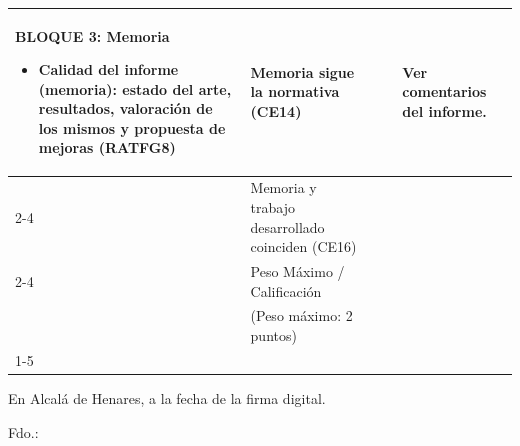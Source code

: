 \begin{landscape}
\begin{table}[ht]
\begin{tabularx}{\linewidth}{|p{7cm}|p{9cm}|p{1cm}|p{1cm}|p{5cm}|}
  \multirow{4}{=}{
  \begin{minipage}[t]{7cm}
    \vspace{-5mm}
    \textbf{BLOQUE 3: Memoria}
    \begin{itemize}[left=5pt, itemsep=1pt, topsep=1pt]
      \item Calidad del informe (memoria): estado del arte, resultados, valoración de los mismos y propuesta de mejoras (RATFG8)
    \end{itemize}
  \end{minipage}}
    & Memoria sigue la normativa (CE14) &  &  &  \multirow[c]{4}{=}{\centering \footnotesize Ver comentarios del informe.} \\ \cline{2-4}
    & Memoria y trabajo desarrollado coinciden (CE16) &  &  &  \\ \cline{2-4}
    & \cellcolor[HTML]{C0C0C0}Peso Máximo / Calificación & \multirow[c]{2}{=}{\centering 2} &  &  \\
    & \cellcolor[HTML]{C0C0C0}(Peso máximo: 2 puntos) &  &  &  \\ \cline{1-5}
\end{tabularx}
\label{tab:evaluacion_tfg}

\end{table}

\par\medskip
\hfill En Alcalá de Henares, a la fecha de la firma digital.
\par\medskip
\hfill Fdo.: \myAcademicTutorFullName
\end{landscape}
